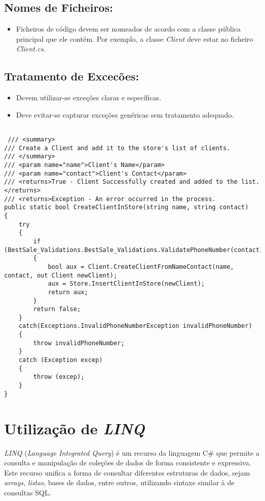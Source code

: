 \documentclass[11pt]{scrartcl} %
\begin{document}
\subsection{Nomes de Ficheiros:}
\begin{itemize}
	\item Ficheiros de código devem ser nomeados de acordo com a classe pública principal que ele contém. Por exemplo, a classe \textit{Client} deve estar no ficheiro \textit{Client.cs}.
\end{itemize}

\subsection{Tratamento de Excecões:}
\begin{itemize}
	\item Devem utilizar-se exceções claras e específicas.
	\item Deve evitar-se capturar exceções genéricas sem tratamento adequado.
\end{itemize}

\newpage

\begin{lstlisting}[language={[Sharp]C}, caption={Exemplo de Utilização destes padrões}, label={Utilização Padrões Microsoft .NET Coding Conventions}]
	
 /// <summary>
/// Create a Client and add it to the store's list of clients.
/// </summary>
/// <param name="name">Client's Name</param>
/// <param name="contact">Client's Contact</param>
/// <returns>True - Client Successfully created and added to the list.</returns>
/// <returns>Exception - An error occurred in the process.
public static bool CreateClientInStore(string name, string contact)
{
	try
	{
		if (BestSale_Validations.BestSale_Validations.ValidatePhoneNumber(contact))
		{
			bool aux = Client.CreateClientFromNameContact(name, contact, out Client newClient);
			aux = Store.InsertClientInStore(newClient);
			return aux;
		}
		return false;
	}
	catch(Exceptions.InvalidPhoneNumberException invalidPhoneNumber)
	{
		throw invalidPhoneNumber;
	}
	catch (Exception excep)
	{
		throw (excep);
	}
}
\end{lstlisting}

\newpage


\section{Utilização de \textit{LINQ}}
\textit{LINQ} (\textit{Language Integrated Query}) é um recurso da linguagem C\# que permite a consulta e manipulação de coleções de dados de forma consistente e expressiva. Este recurso unifica a forma de consultar diferentes estruturas de dados, sejam \textit{arrays}, \textit{listas}, bases de dados, entre outros, utilizando sintaxe similar à de consultas SQL.
\end{document}
